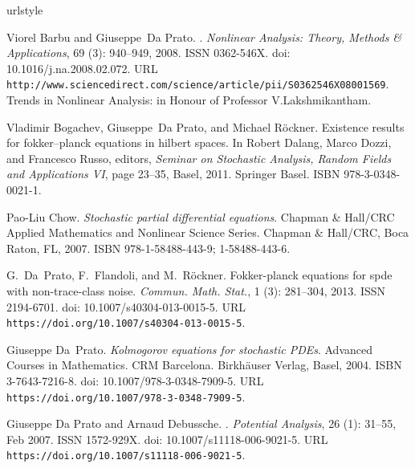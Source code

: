 \documentclass[]{interact}
\theoremstyle{plain}%
\theoremstyle{definition}
\theoremstyle{remark}
\begin{document}
\begin{thebibliography}{20}
\providecommand{\natexlab}[1]{#1}
\providecommand{\url}[1]{\texttt{#1}}
\expandafter\ifx\csname urlstyle\endcsname\relax
  \providecommand{\doi}[1]{doi: #1}\else
  \providecommand{\doi}{doi: \begingroup \urlstyle{rm}\Url}\fi

Viorel Barbu and Giuseppe~Da Prato.
.
\newblock \emph{Nonlinear Analysis: Theory, Methods \& Applications},
  69 (3): 940–949, 2008.
\newblock ISSN 0362-546X.
\newblock \doi{10.1016/j.na.2008.02.072}.
\newblock URL
  \url{http://www.sciencedirect.com/science/article/pii/S0362546X08001569}.
\newblock Trends in Nonlinear Analysis: in Honour of Professor
  V.Lakshmikantham.

Vladimir Bogachev, Giuseppe~Da Prato, and Michael R\"{o}ckner.
\newblock Existence results for fokker–planck equations in hilbert spaces.
\newblock In Robert Dalang, Marco Dozzi, and Francesco Russo, editors,
  \emph{Seminar on Stochastic Analysis, Random Fields and Applications VI},
  page 23–35, Basel, 2011. Springer Basel.
\newblock ISBN 978-3-0348-0021-1.

Pao-Liu Chow.
\newblock \emph{Stochastic partial differential equations}.
\newblock Chapman \& Hall/CRC Applied Mathematics and Nonlinear Science Series.
  Chapman \& Hall/CRC, Boca Raton, FL, 2007.
\newblock ISBN 978-1-58488-443-9; 1-58488-443-6.

G.~Da~Prato, F.~Flandoli, and M.~R\"{o}ckner.
\newblock Fokker-planck equations for spde with non-trace-class noise.
\newblock \emph{Commun. Math. Stat.}, 1 (3): 281--304, 2013.
\newblock ISSN 2194-6701.
\newblock \doi{10.1007/s40304-013-0015-5}.
\newblock URL \url{https://doi.org/10.1007/s40304-013-0015-5}.

Giuseppe Da~Prato.
\newblock \emph{Kolmogorov equations for stochastic {PDE}s}.
\newblock Advanced Courses in Mathematics. CRM Barcelona. Birkh\"{a}user
  Verlag, Basel, 2004.
\newblock ISBN 3-7643-7216-8.
\newblock \doi{10.1007/978-3-0348-7909-5}.
\newblock URL \url{https://doi.org/10.1007/978-3-0348-7909-5}.

Giuseppe {Da Prato} and Arnaud Debussche.
.
\newblock \emph{Potential Analysis}, 26 (1): 31–55, Feb
  2007.
\newblock ISSN 1572-929X.
\newblock \doi{10.1007/s11118-006-9021-5}.
\newblock URL \url{https://doi.org/10.1007/s11118-006-9021-5}.


\end{thebibliography}
\end{document}
